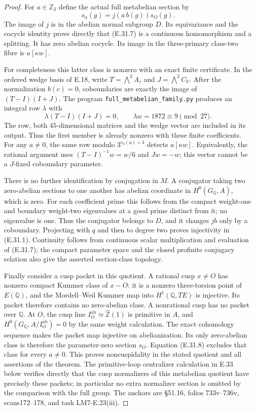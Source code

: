 \begin{proof}
For $a\in\mathbb Z_3$ define the actual full metabelian
section by
\[
                     s_a(g)=j(a\,b(g))s_O(g).
 \tag{E.31.7}
\]
The image of $j$ is in the abelian normal subgroup $D$.
Its equivariance and the cocycle identity prove directly
that (E.31.7) is a continuous homomorphism and a splitting.
It has zero abelian cocycle. Its image in the three-primary
class-two fibre is $a[\kappa w]$.

For completeness this latter class is nonzero with an exact
finite certificate. In the ordered wedge basis of E.18,
write $T=\bigwedge^2 A_\tau$ and $J=\bigwedge^2 C_V$.
After the normalization $b(c)=0$, coboundaries are exactly
the image of $(T-I)(I+J)$. The program
\texttt{full\_metabelian\_family.py} produces an integral
row $\lambda$ with
\[
 \lambda(T-I)(I+J)=0,
                   \qquad \lambda w=1872\equiv9\pmod{27}.
 \tag{E.31.8}
\]
The row, both $45$-dimensional matrices and the wedge
vector are included in its output. Thus the first member
is already nonzero with these finite coefficients.
For any $a\ne0$, the same row modulo
$3^{v_3(a)+3}$ detects $a[\kappa w]$.
Equivalently, the rational argument uses
$(T-I)^{-1}w=w/6$ and $Jw=-w$; this vector cannot be
a $J$-fixed coboundary parameter.

There is no further identification by conjugation in $M$.
A conjugator taking two zero-abelian sections to one another
has abelian coordinate in $H^0(G_{\mathbb Q},A)$, which is zero.
For each coefficient prime this follows from the compact
weight-one and boundary weight-two eigenvalues at a good
prime distinct from it; no eigenvalue is one. Thus the
conjugator belongs to $D$, and it changes $jb$ only by a
coboundary. Projecting with $q$ and then to degree two
proves injectivity in (E.31.1). Continuity follows from
continuous scalar multiplication and evaluation of (E.31.7);
the compact parameter space and the closed profinite
conjugacy relation also give the asserted section-class topology.

Finally consider a cusp packet in this quotient. A rational
cusp $x\ne O$ has nonzero compact Kummer class of $x-O$:
it is a nonzero three-torsion point of $E(\mathbb Q)$,
and the Mordell--Weil Kummer map into $H^1(\mathbb Q,TE)$
is injective. Its packet therefore contains no zero-abelian
class. A nonrational cusp has no packet over $\mathbb Q$.
At $O$, the cusp line $I_O^{\mathrm{ab}}\simeq
\widehat{\mathbb Z}(1)$ is primitive in $A$, and
$H^0(G_{\mathbb Q},A/I_O^{\mathrm{ab}})=0$ by the same
weight calculation. The exact cohomology sequence makes
the packet map injective on abelianization. Its only
zero-abelian class is therefore the parameter-zero
section $s_O$. Equation (E.31.8) excludes that class
for every $a\ne0$. This proves noncuspidality in the
stated quotient and all assertions of the theorem.
The primitive-loop centralizer calculation in E.33
below verifies directly that the cusp normalizers
of this metabelian quotient have precisely these
packets; in particular no extra normalizer section
is omitted by the comparison with the full group.
The anchors are \S51.16, folios 733v--736v, scans172--178,
and task LM7-E.23(iii).
\end{proof}
